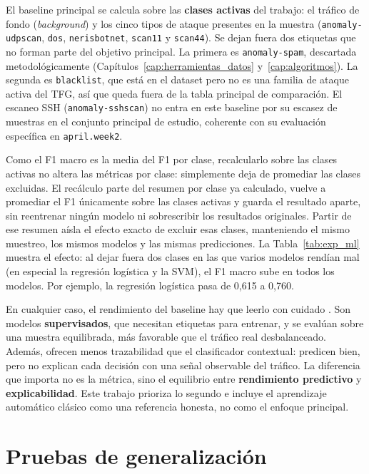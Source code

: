 El baseline principal se calcula sobre las \textbf{clases activas} del trabajo: el tráfico de fondo (\emph{background}) y los cinco tipos de ataque presentes en la muestra (\texttt{anomaly-udpscan}, \texttt{dos}, \texttt{nerisbotnet}, \texttt{scan11} y \texttt{scan44}). Se dejan fuera dos etiquetas que no forman parte del objetivo principal. La primera es \texttt{anomaly-spam}, descartada metodológicamente (Capítulos~\ref{cap:herramientas_datos} y~\ref{cap:algoritmos}). La segunda es \texttt{blacklist}, que está en el dataset pero no es una familia de ataque activa del TFG, así que queda fuera de la tabla principal de comparación. El escaneo SSH (\texttt{anomaly-sshscan}) no entra en este baseline por su escasez de muestras en el conjunto principal de estudio, coherente con su evaluación específica en \texttt{april.week2}.

Como el F1 macro es la media del F1 por clase, recalcularlo sobre las clases activas no altera las métricas por clase: simplemente deja de promediar las clases excluidas. El recálculo parte del resumen por clase ya calculado, vuelve a promediar el F1 únicamente sobre las clases activas y guarda el resultado aparte, sin reentrenar ningún modelo ni sobrescribir los resultados originales. Partir de ese resumen aísla el efecto exacto de excluir esas clases, manteniendo el mismo muestreo, los mismos modelos y las mismas predicciones. La Tabla~\ref{tab:exp_ml} muestra el efecto: al dejar fuera dos clases en las que varios modelos rendían mal (en especial la regresión logística y la SVM), el F1 macro sube en todos los modelos. Por ejemplo, la regresión logística pasa de 0,615 a 0,760.

En cualquier caso, el rendimiento del baseline hay que leerlo con cuidado \cite{sommer2010outside}. Son modelos \textbf{supervisados}, que necesitan etiquetas para entrenar, y se evalúan sobre una muestra equilibrada, más favorable que el tráfico real desbalanceado. Además, ofrecen menos trazabilidad que el clasificador contextual: predicen bien, pero no explican cada decisión con una señal observable del tráfico. La diferencia que importa no es la métrica, sino el equilibrio entre \textbf{rendimiento predictivo} y \textbf{explicabilidad}. Este trabajo prioriza lo segundo e incluye el aprendizaje automático clásico como una referencia honesta, no como el enfoque principal.

\section{Pruebas de generalización}
\label{sec:exp_generalizacion}

